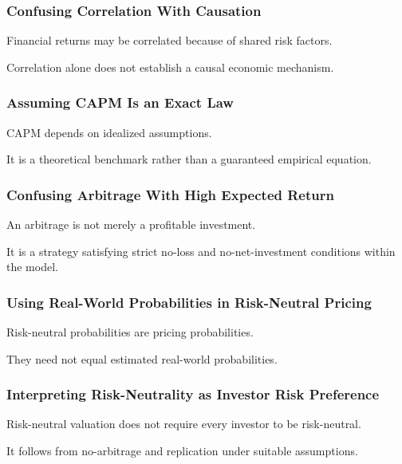 \subsubsection{Confusing Correlation With Causation}

Financial returns may be correlated because of shared risk factors.

Correlation alone does not establish a causal economic mechanism.

\subsubsection{Assuming CAPM Is an Exact Law}

CAPM depends on idealized assumptions.

It is a theoretical benchmark rather than a guaranteed empirical equation.

\subsubsection{Confusing Arbitrage With High Expected Return}

An arbitrage is not merely a profitable investment.

It is a strategy satisfying strict no-loss and no-net-investment conditions
within the model.

\subsubsection{Using Real-World Probabilities in Risk-Neutral Pricing}

Risk-neutral probabilities are pricing probabilities.

They need not equal estimated real-world probabilities.

\subsubsection{Interpreting Risk-Neutrality as Investor Risk Preference}

Risk-neutral valuation does not require every investor to be risk-neutral.

It follows from no-arbitrage and replication under suitable assumptions.

